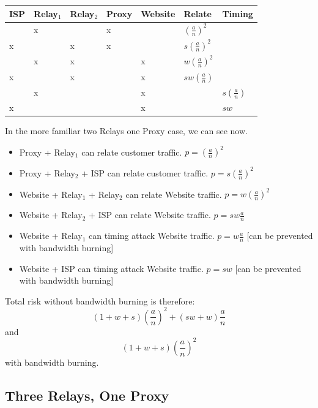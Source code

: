 \documentclass{article}
\begin{document}
\begin{center}
\begin{tabular}{l | l | l | l | l | l | l}
  ISP & Relay$_1$ & Relay$_2$ & Proxy & Website & Relate             & Timing \\
  \hline
      & x         &           & x     &         & $(\frac{a}{n})^2$  & \\
  \hline
  x   &           & x         & x     &         & $s(\frac{a}{n})^2$ & \\
  \hline
      & x         & x         &       & x       & $w(\frac{a}{n})^2$ & \\
  \hline
  x   &           & x         &       & x       & $sw(\frac{a}{n})$  & \\
  \hline
      & x         &           &       & x       &                    & $s(\frac{a}{n})$ \\
  \hline
  x   &           &           &       & x       &                    & $sw$ \\
\end{tabular}
\end{center}

In the more familiar two Relays one Proxy case, we can see now.

\begin{itemize}
\item Proxy + Relay$_1$ can relate customer traffic. $p = (\frac{a}{n})^2$
\item Proxy + Relay$_2$ + ISP can relate customer traffic. $p = s(\frac{a}{n})^2$
\item Website + Relay$_1$ + Relay$_2$ can relate Website traffic. $p = w(\frac{a}{n})^2$
\item Website + Relay$_2$ + ISP can relate Website traffic. $p = sw\frac{a}{n}$
\item Website + Relay$_1$ can timing attack Website traffic. $p = w\frac{a}{n}$ [can be prevented with bandwidth burning]
\item Website + ISP can timing attack Website traffic. $p = sw$ [can be prevented with bandwidth burning]
\end{itemize}

Total risk without bandwidth burning is therefore: $$(1+w+s)(\frac{a}{n})^2 + (sw+w)\frac{a}{n}$$ and $$(1 + w + s) (\frac{a}{n})^2$$ with bandwidth burning.

\subsection{Three Relays, One Proxy}
\end{document}
